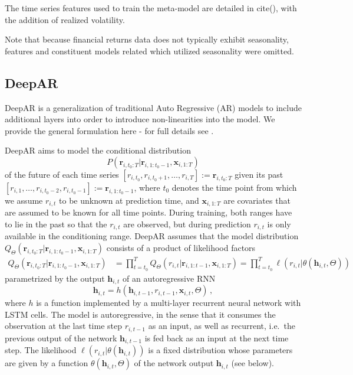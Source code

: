 \documentclass{article}
\newcommand{\rs}[2]{r_{#1, #2}}
\newcommand{\xbf}{\mathbf{x}}
\newcommand{\rVec}[3]{\mathbf{r}_{#1, #2:#3}}
\newcommand{\xVec}[3]{\mathbf{x}_{#1, #2:#3}}
\newcommand{\hVec}{\mathbf{h}}
\begin{document}
The time series features used to train the meta-model are detailed in cite(), with the addition of realized volatility.

Note that because financial returns data does not typically exhibit seasonality, features and constituent models related which utilized seasonality were omitted.

\FloatBarrier
\subsection{DeepAR}

DeepAR is a generalization of traditional Auto Regressive (AR) models to include additional layers into order to introduce non-linearities into the model. We provide the general formulation here - for full details see \cite{salinas_deepar_2019}.


\newcommand{\modelDist}{Q_\Theta(\rVec{i}{t_0}{T} | \rVec{i}{1}{t_0-1}, \xVec{i}{1}{T})}

DeepAR aims to model the conditional distribution 
\begin{equation*}
P(\rVec{i}{t_0}{T} | \rVec{i}{1}{t_0-1}, \xVec{i}{1}{T})
\label{eq:condDist}
\end{equation*} 
of the future of each time series $[\rs{i}{t_0}, \rs{i}{t_0 + 1}, \ldots, \rs{i}{T}] := \rVec{i}{t_0}{T}$ given its \hbox{past $[\rs{i}{1}, \ldots, \rs{i}{t_0-2}, \rs{i}{t_0-1}] := \rVec{i}{1}{t_0-1}$}, where $t_0$ denotes the time point from which we assume $\rs{i}{t}$ to be unknown at prediction time, and $\xVec{i}{1}{T}$ are covariates that are assumed to be known for all time points. During training, both ranges have to lie in the past so that the $\rs{i}{t}$ are observed, but during prediction $\rs{i}{t}$ is only available in the conditioning range. DeepAR assumes that the model distribution $\modelDist$ consists of a product of likelihood factors
\begin{align*}
\modelDist &= \prod\nolimits_{t=t_0}^T Q_\Theta(r_{i,t}|\mathbf{r}_{i,1:t-1}, \xVec{i}{1}{T}) = \prod\nolimits_{t=t_0}^T \ell(\rs{i}{t} | \theta(\hVec_{i, t}, \Theta))
\end{align*}
parametrized by the output $\hVec_{i, t}$ of an autoregressive RNN
\begin{equation}
\hVec_{i, t} = h\left(\hVec_{i, t-1}, \rs{i}{t-1}, \xbf_{i, t}, \Theta\right) \,,
\label{eq:recurrence}
\end{equation}
where $h$ is a function implemented by a multi-layer recurrent neural network with LSTM cells. The model is autoregressive, in the sense that it consumes the observation at the last time step $\rs{i}{t-1}$ as an input, as well as recurrent, i.e.\ the previous output of the network $\hVec_{i,t-1}$ is fed back as an input at the next time step. The likelihood $\ell(\rs{i}{t}|\theta(\hVec_{i,t}))$ is a fixed distribution whose parameters are given by a function $\theta(\hVec_{i,t}, \Theta)$ of the network output $\hVec_{i, t}$ (see below).
\end{document}

